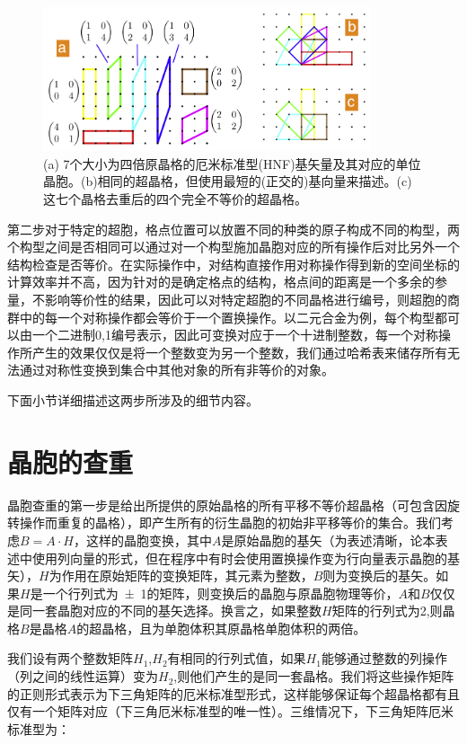 \begin{figure}
  \includegraphics[width=0.86\textwidth]{figs/ch4_2d_square_lattice.png}
  \caption{(a) 7个大小为四倍原晶格的厄米标准型(HNF)基矢量及其对应的单位晶胞。(b)相同的超晶格，但使用最短的(正交的)基向量来描述。(c)这七个晶格去重后的四个完全不等价的超晶格。}
  \label{fig:ch4_2d_square_lattice}
\end{figure}

第二步对于特定的超胞，格点位置可以放置不同的种类的原子构成不同的构型，两个构型之间是否相同可以通过对一个构型施加晶胞对应的所有操作后对比另外一个结构检查是否等价。在实际操作中，对结构直接作用对称操作得到新的空间坐标的计算效率并不高，因为针对的是确定格点的结构，格点间的距离是一个多余的参量，不影响等价性的结果，因此可以对特定超胞的不同晶格进行编号，则超胞的商群中的每一个对称操作都会等价于一个置换操作。以二元合金为例，每个构型都可以由一个二进制0,1编号表示，因此可变换对应于一个十进制整数，每一个对称操作所产生的效果仅仅是将一个整数变为另一个整数，我们通过哈希表来储存所有无法通过对称性变换到集合中其他对象的所有非等价的对象。

下面小节详细描述这两步所涉及的细节内容。

\section{晶胞的查重}
晶胞查重的第一步是给出所提供的原始晶格的所有平移不等价超晶格（可包含因旋转操作而重复的晶格），即产生所有的衍生晶胞的初始非平移等价的集合。我们考虑$B=A\cdot H$，这样的晶胞变换，其中$A$是原始晶胞的基矢（为表述清晰，论本表述中使用列向量的形式，但在程序中有时会使用置换操作变为行向量表示晶胞的基矢），$H$为作用在原始矩阵的变换矩阵，其元素为整数，$B$则为变换后的基矢。如果$H$是一个行列式为\num{+-1}的矩阵，则变换后的晶胞与原晶胞物理等价，$A$和$B$仅仅是同一套晶胞对应的不同的基矢选择。换言之，如果整数$H$矩阵的行列式为\num{2},则晶格$B$是晶格$A$的超晶格，且为单胞体积其原晶格单胞体积的两倍。

我们设有两个整数矩阵$H_1$,$H_2$有相同的行列式值，如果$H_1$能够通过整数的列操作（列之间的线性运算）变为$H_2$,则他们产生的是同一套晶格。我们将这些操作矩阵的正则形式表示为下三角矩阵的厄米标准型形式，这样能够保证每个超晶格都有且仅有一个矩阵对应（下三角厄米标准型的唯一性\cite{santoro1973coincidence}）。三维情况下，下三角矩阵厄米标准型为：

